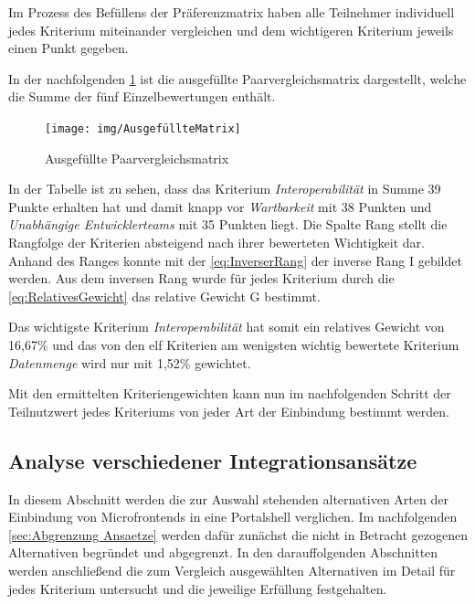 Im Prozess des Befüllens der Präferenzmatrix haben alle Teilnehmer individuell jedes Kriterium miteinander vergleichen und dem wichtigeren Kriterium jeweils einen Punkt gegeben.

In der nachfolgenden \cref{fig:Paarvergleichsmethode} ist die ausgefüllte Paarvergleichsmatrix dargestellt, welche die Summe der fünf Einzelbewertungen enthält.

\begin{figure}[hbt!]
	\begin{minipage}[t]{1\textwidth}	
		\caption{Ausgefüllte Paarvergleichsmatrix}
		\texttt{[image: img/AusgefüllteMatrix]}\\ %
		\label{fig:Paarvergleichsmethode}
	\end{minipage}
\end{figure}

In der Tabelle ist zu sehen, dass das Kriterium \textit{Interoperabilität} in Summe 39 Punkte erhalten hat und damit knapp vor \textit{Wartbarkeit} mit 38 Punkten und \textit{Unabhängige Entwicklerteams} mit 35 Punkten liegt. 
Die Spalte Rang stellt die Rangfolge der Kriterien absteigend nach ihrer bewerteten Wichtigkeit dar. Anhand des Ranges konnte mit der \cref{eq:InverserRang} der inverse Rang I gebildet werden. Aus dem inversen Rang wurde für jedes Kriterium durch die \cref{eq:RelativesGewicht} das relative Gewicht G bestimmt.

Das wichtigste Kriterium \textit{Interoperabilität} hat somit ein relatives Gewicht von 16,67\% und das von den elf Kriterien am wenigsten wichtig bewertete Kriterium \textit{Datenmenge} wird nur mit 1,52\% gewichtet.

Mit den ermittelten Kriteriengewichten kann nun im nachfolgenden Schritt der Teilnutzwert jedes Kriteriums von jeder Art der Einbindung bestimmt werden.

\subsection{Analyse verschiedener Integrationsansätze}\label{sec:AnalyseVerschiedenerIntegrationsansaetze}

In diesem Abschnitt werden die zur Auswahl stehenden alternativen Arten der Einbindung von Microfrontends in eine Portalshell verglichen. Im nachfolgenden \cref{sec:Abgrenzung Ansaetze} werden dafür zunächst die nicht in Betracht gezogenen Alternativen begründet und abgegrenzt. 
In den darauffolgenden Abschnitten werden anschließend die zum Vergleich ausgewählten Alternativen im Detail für jedes Kriterium untersucht und die jeweilige Erfüllung festgehalten.

